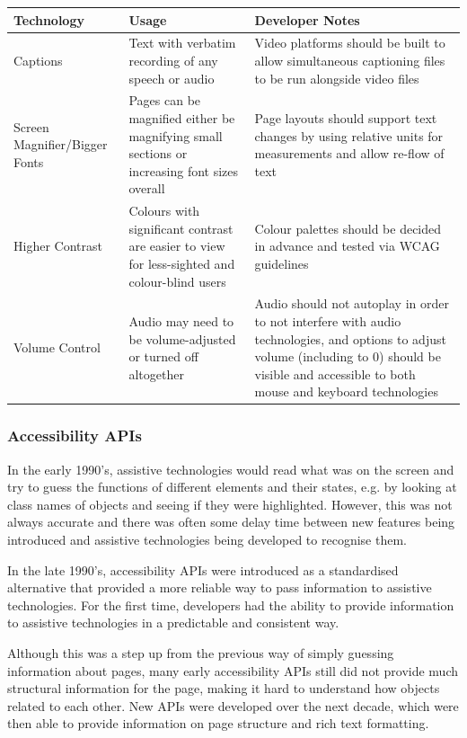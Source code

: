 \documentclass[ %
                    author={Aleena Baig},
                supervisor={Dr Simon Lock},
                    degree={BSc},
                     title={On Making Web Accessible Graphs},
                  subtitle={},
                      year={2019} ]{dissertation}
\begin{document}
\begin{center}
\begin{tabular}{|p{3cm}|p{5cm}|p{5cm}|}
 \hline
 Technology & Usage & Developer Notes \\ [0.5ex]
 \hline \hline
 Captions & Text with verbatim recording of any speech or audio & Video platforms should be built to allow simultaneous captioning files to be run alongside video files \\
 \hline
 Screen Magnifier/Bigger Fonts & Pages can be magnified either be magnifying small sections or increasing font sizes overall & Page layouts should support text changes by using relative units for measurements and allow re-flow of text \\
 \hline
 Higher Contrast & Colours with significant contrast are easier to view for less-sighted and colour-blind users & Colour palettes should be decided in advance and tested via WCAG guidelines \\
 \hline
 Volume Control & Audio may need to be volume-adjusted or turned off altogether & Audio should not autoplay in order to not interfere with audio technologies, and options to adjust volume (including to 0) should be visible and accessible to both mouse and keyboard technologies \\ [1ex]
 \hline
\end{tabular}
\end{center}


\subsubsection{Accessibility APIs}

In the early 1990's, assistive technologies would read what was on the screen and try to guess the functions of different elements and their states, e.g. by looking at class names of objects and seeing if they were highlighted. However, this was not always accurate and there was often some delay time between new features being introduced and assistive technologies being developed to recognise them. \cite{smashingAPIs}

In the late 1990's, accessibility APIs were introduced as a standardised alternative that provided a more reliable way to pass information to assistive technologies. For the first time, developers had the ability to provide information to assistive technologies in a predictable and consistent way.

Although this was a step up from the previous way of simply guessing information about pages, many early accessibility APIs still did not provide much structural information for the page, making it hard to understand how objects related to each other. New APIs were developed over the next decade, which were then able to provide information on page structure and rich text formatting.
\end{document}
